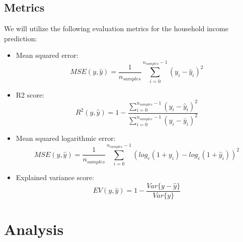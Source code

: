 \documentclass{article}
\begin{document}
\subsection{Metrics}
We will utilize the following evaluation metrics for the household income prediction:
\begin{itemize}
  \item Mean squared error:
    \begin{equation}
      MSE(y, \hat{y}) = \frac{1}{n_{samples}}\sum_{i=0}^{n_{samples} - 1}(y_i - \hat{y}_i)^2
    \end{equation}
  \item R2 score:
    \begin{equation}
      R^2(y, \hat{y}) = 1 - \frac{\sum_{i=0}^{n_{samples} - 1}(y_i - \hat{y}_i)^2}{\sum_{i=0}^{n_{samples} - 1}(y_i - \bar{y}_i)^2}
    \end{equation}
  \item Mean squared logarithmic error:
    \begin{equation}
      MSE(y, \hat{y}) = \frac{1}{n_{samples}}\sum_{i=0}^{n_{samples} - 1}(log_e(1 + y_i) - log_e(1 + \hat{y}_i))^2
    \end{equation}
  \item Explained variance score:
    \begin{equation}
      EV(y, \hat{y}) = 1 - \frac{Var\{y - \hat{y}\}}{Var\{y\}}
    \end{equation}
\end{itemize}
\section{Analysis}
\end{document}
